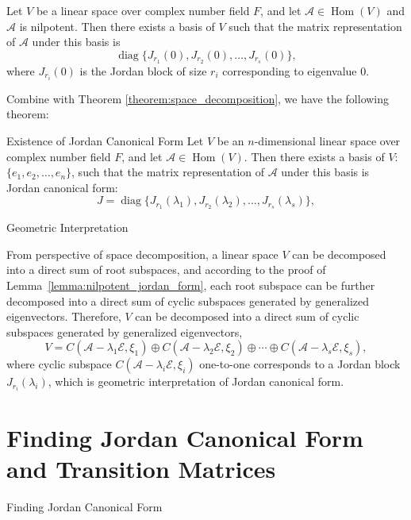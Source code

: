 \documentclass[11pt]{../../TexTemplate/elegantbook} %
\begin{document}
\begin{lemma}\label{lemma:nilpotent_jordan_form}
    Let \( V \) be a linear space over complex number field \( F \), 
    and let \( \mathcal{A}\in \operatorname{Hom}(V) \) and \(\mathcal{A}\) is nilpotent.
    Then there exists a basis of \( V \) such that 
    the matrix representation of \( \mathcal{A} \) under this basis is
    \[
    \operatorname{diag}\{ J_{r_{1}}(0), J_{r_{2}}(0), \ldots, J_{r_{s}}(0) \},
    \]
    where \( J_{r_{i}}(0) \) is the Jordan block of size \( r_i \) corresponding to eigenvalue \( 0 \).
\end{lemma}
Combine with Theorem \ref{theorem:space_decomposition}, we have the following theorem:
\begin{theorem}{Existence of Jordan Canonical Form}
    Let \( V \) be an \( n \)-dimensional linear space over complex number field \( F \),
    and let \( \mathcal{A}\in \operatorname{Hom}(V) \).
    Then there exists a basis of \( V \): \(\{ e_{1}, e_{2}, \ldots, e_{n} \}\),
    such that the matrix representation of \( \mathcal{A} \) under this basis is Jordan canonical form:
    \[
    J = \operatorname{diag}\{ J_{r_{1}}(\lambda_{1}), J_{r_{2}}(\lambda_{2}), \ldots, J_{r_{s}}(\lambda_{s}) \},
    \]
\end{theorem}

\begin{leftbarTitle}{Geometric Interpretation}\end{leftbarTitle} %
From perspective of space decomposition, a linear space \( V \) can be decomposed into a direct sum of root subspaces,
and according to the proof of Lemma~\ref{lemma:nilpotent_jordan_form},
each root subspace can be further decomposed into a direct sum of cyclic subspaces generated by generalized eigenvectors.
Therefore, \(V\) can be decomposed into a direct sum of cyclic subspaces generated by generalized eigenvectors,
\[
V = C(\mathcal{A}-\lambda_{1}\mathcal{E}, \xi_{1}) \oplus C(\mathcal{A}-\lambda_{2}\mathcal{E}, \xi_{2}) \oplus \cdots \oplus 
C(\mathcal{A}-\lambda_{s}\mathcal{E}, \xi_{s}),
\]
where cyclic subspace \( C(\mathcal{A}-\lambda_{i}\mathcal{E}, \xi_{i}) \) one-to-one corresponds to 
a Jordan block \( J_{r_{i}}(\lambda_{i}) \), which is geometric interpretation of Jordan canonical form.


\section{Finding Jordan Canonical Form and Transition Matrices}
\begin{leftbarTitle}{Finding Jordan Canonical Form}\end{leftbarTitle}
\end{document}
